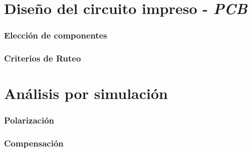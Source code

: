 \documentclass[10pt,a4paper]{article}
\begin{document}
	\part{Diseño del circuito impreso - \emph{PCB}}\label{part:pcb}

		\section{Elección de componentes}\label{sec:componentes}
			

		\section{Criterios de Ruteo}\label{sec:ruteo}
			

	\part{Análisis por simulación}\label{part:sim}
		
		\section{Polarización}\label{sec:sim_pol}
			
		
		\section{Compensación}\label{sec:sim_compensacion}
			
\end{document}
